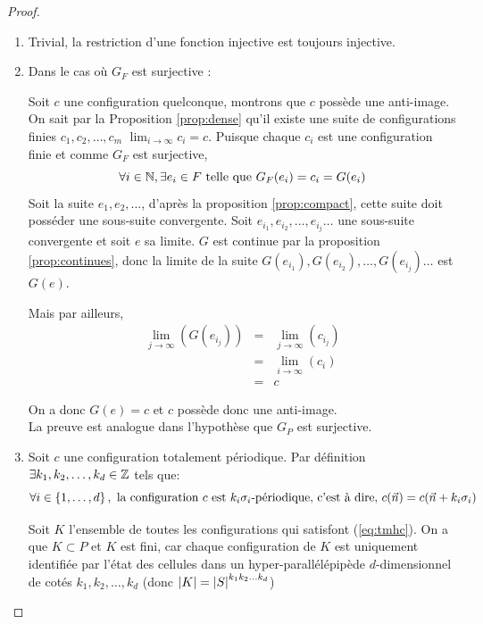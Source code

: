 \begin{proof}

	\begin{enumerate}
		\item Trivial, la restriction d'une fonction injective est toujours injective.
		\item Dans le cas où $G_F$ est surjective :

		      Soit $c$ une configuration quelconque, montrons que $c$ possède une anti-image.
		      On sait par la Proposition \ref{prop:dense} qu'il existe
		      une suite de configurations finies $c_1, c_2, \ldots , c_m$ \tlq $\lim_{i \to \infty} c_i = c$.
		      Puisque chaque $c_i$ est une configuration finie et comme $G_F$ est surjective,
		      $$\forall i\in \mathbb{N},  \exists e_i \in F \mbox{ telle que } G_F(e_i) = c_i = G(e_i)$$
		      Soit la suite $e_1, e_2, \ldots $, d'après la proposition  \ref{prop:compact},
		      cette suite doit posséder une  sous-suite convergente. Soit $ e_{i_1}, e_{i_2}, \ldots , e_{i_j} \ldots$ une
		      sous-suite convergente et soit  $e$ sa limite.
		      $G$ est continue par la proposition \ref{prop:continues}, donc la limite de la suite
		      $G(e_{i_1}), G(e_{i_2}), \ldots , G(e_{i_j}) \ldots$ est   $G(e)$.

		      Mais par ailleurs,
		      \begin{eqnarray*}
			      \lim_{j \to \infty} (G(e_{i_j})) &=& \lim_{j \to \infty} (c_{i_j}) \\
			      &=& \lim_{i \to \infty} (c_i) \\
			      &=& c
		      \end{eqnarray*}

		      On a donc $G(e) = c$ et $c$ possède donc une anti-image.\\
		      La preuve est analogue dans l'hypothèse que $G_P$ est surjective.
		\item Soit $c$ une configuration totalement périodique. Par définition
		      $\exists k_1, k_2, \ldots, k_d \in \mathbb{Z}$ tels que:
		      \begin{equation}
			      \forall i \in \left\{1,\ldots,d\right\}, \ \text{la configuration }  c \text{ est } {k_i}\sigma_i\text{-périodique,}
			      \text{ c'est à dire, }
			      c(\vec n) = c(\vec n +  k_i \sigma_i)
			      \label{eq:tmhc}
		      \end{equation}

		      Soit $K$ l'ensemble de toutes les configurations qui satisfont (\ref{eq:tmhc}). On a que $K \subset P$ et $K$ est fini,
		      car chaque configuration de $K$ est uniquement identifiée par l'état des cellules dans un
		      hyper-parallélépipède $d$-dimensionnel de cotés $k_1, k_2, \ldots, k_d$
		      (donc $\left|K\right| = {\left|S\right|}^{k_1k_2\ldots k_d}$)


\end{enumerate}
\end{proof}

